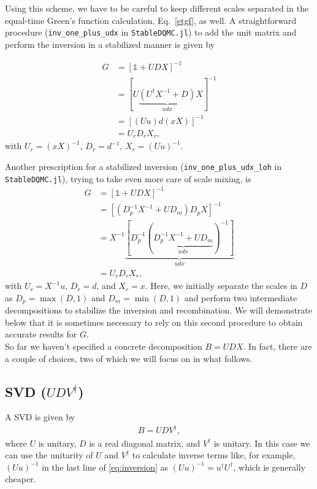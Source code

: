 \documentclass[%
 reprint,
superscriptaddress,
citeautoscript,
showpacs,
 amsmath,amssymb,
 aps,
 prb,
longbibliography,
]{revtex4-1}
\begin{document}
Using this scheme, we have to be careful to keep different scales separated in the equal-time Green's function calculation, Eq.~\ref{etgf}, as well. A straightforward procedure (\texttt{inv\_one\_plus\_udx} in \texttt{StableDQMC.jl}) to add the unit matrix and perform the inversion in a stabilized manner is given by\cite{Santos2003, Assaad2002a}

\begin{align}
	G &= [\mathbb{1} + UDX]^{-1} \nonumber \\
	&= [U\underbrace{(U^\dagger X^{-1} + D)}_{udx}X]^{-1} \nonumber\\
	&= [(Uu)d(xX)]^{-1} \label{eq:inversion}\\
	&= U_r D_r X_r \nonumber,
\end{align}
with $U_r = (xX)^{-1}$, $D_r = d^{-1}$, $X_r = (Uu)^{-1}$.

Another prescription for a stabilized inversion (\texttt{inv\_one\_plus\_udx\_loh} in \texttt{StableDQMC.jl}), trying to take even more care of scale mixing, is\cite{Loh2005, Loh1989}
\begin{align}
	G &= [\mathbb{1} + UDX]^{-1} \nonumber\\
	&= [(D_p^{-1} X^{-1} + U D_m) D_p X]^{-1} \nonumber \\
	&= X^{-1} \underbrace{[D_p^{-1} (\underbrace{D_p^{-1} X^{-1} + UD_m}_{udx})^{-1}]}_{udx} \label{eq:inversion_loh} \\
	&= U_r D_r X_r, \nonumber
\end{align}
with $U_r = X^{-1}u$, $D_r = d$, and $X_r = x$. Here, we initially separate the scales in $D$ as $D_p = \max(D, 1)$ and $D_m = \min(D, 1)$ and perform two intermediate decompositions to stabilize the inversion and recombination. We will demonstrate below that it is sometimes necessary to rely on this second procedure to obtain accurate results for $G$.\\

So far we haven't specified a concrete decomposition $B = UDX$. In fact, there are a couple of choices, two of which we will focus on in what follows.

\subsection{SVD ($UDV^\dagger$)}
A SVD is given by
\begin{align}
	B = UDV^\dagger,
\end{align}
where $U$ is unitary, $D$ is a real diagonal matrix, and $V^\dagger$ is unitary. In this case we can use the unitarity of $U$ and $V^\dagger$ to calculate inverse terms like, for example, $(Uu)^{-1}$ in the last line of \ref{eq:inversion} as $(Uu)^{-1} = u^\dagger U^\dagger$, which is generally cheaper.
\end{document}
